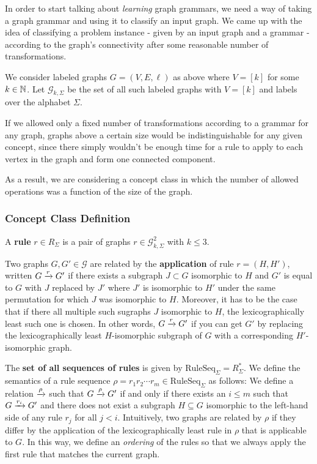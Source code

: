 \documentclass[]{article}
\def\RuleSeq{\mathrm{RuleSeq}\xspace}
\def\Graphs{\mathcal{G}\xspace}
\begin{document}
In order to start talking about \emph{learning} graph grammars, we need a way of
taking a graph grammar and using it to classify an input graph. We came up with
the idea of classifying a problem instance - given by an input graph and a
grammar - according to the graph's connectivity after some reasonable number of transformations.

We consider labeled graphs $G = (V,E,\ell)$ as above where $V = [k]$ for some
$k\in \N$. Let $\Graphs_{k,\Sigma}$ be the set of all such labeled graphs with
$V=[k]$ and labels over the alphabet $\Sigma$.

If we allowed only a fixed number of transformations according to a grammar for
any graph, graphs above a certain size would be indistinguishable for any given
concept, since there simply wouldn't be enough time for a rule to apply to each
vertex in the graph and form one connected component.

As a result, we are considering a concept class in which the number of allowed
operations was a function of the size of the graph.

\subsubsection{Concept Class Definition}

A \textbf{rule} $r \in R_{\Sigma}$ is a pair of graphs
$r \in \Graphs_{k,\Sigma}^2$ with $k \leq 3$.

Two graphs $G,G' \in \Graphs$ are related by the \textbf{application} of rule
$r = (H,H')$, written $G \xrightarrow{r} G'$ if there exists a subgraph $J \subset G$
isomorphic to $H$ and $G'$ is equal to $G$ with $J$ replaced by $J'$ where $J'$
is isomorphic to $H'$ under the same permutation for which $J$ was isomorphic to
$H$. Moreover, it has to be the case that if there all multiple such sugraphs
$J$ isomorphic to $H$, the lexicographically least such one is chosen.
In other words, $G \xrightarrow{r} G'$ if you can get $G'$ by replacing the
lexicographically least $H$-isomorphic subgraph of $G$ with a corresponding
$H'$-isomorphic graph.

The \textbf{set of all sequences of rules} is given by
$\RuleSeq_{\Sigma} = R_{\Sigma}^*$. We define the semantics of a rule sequence
$\rho = r_1r_2\dotsm r_m \in \RuleSeq_{\Sigma}$ as follows: We define a relation
$\xrightarrow{\rho}$ such that $G \xrightarrow{\rho} G'$ if and only if there exists an
$i\leq m$ such that $G\xrightarrow{r_i} G'$ and there does not exist a subgraph
$H \subseteq G$ isomorphic to the left-hand side of any rule $r_j$ for all
$j < i$. Intuitively, two graphs are related by $\rho$ if they differ by the
application of the lexicographically least rule in $\rho$ that is applicable to
$G$. In this way, we define an \emph{ordering} of the rules so that we always apply
the first rule that matches the current graph.
\end{document}
